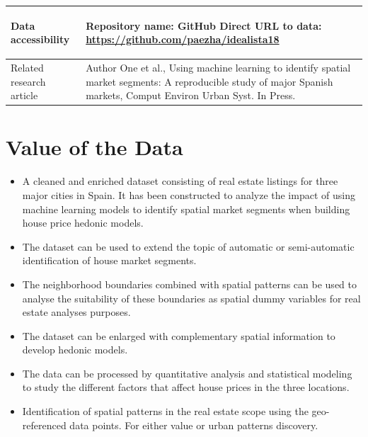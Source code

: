\documentclass[times,final]{elsarticle}
\begin{document}
{\begin{longtable}{|p{33mm}|p{94mm}|}
%
%
\hline
\hypertarget{target1}
{Data accessibility}   & Repository name: GitHub\newline
                         Direct URL to data: \url{https://github.com/paezha/idealista18}\\
\hline
Related
research\newline
article                & Author One et al., Using machine learning to identify spatial market segments: A reproducible study of major Spanish markets, Comput Environ Urban Syst. In Press.\newline
\end{longtable}
}

\section*{Value of the Data}

\begin{itemize}
\itemsep=0pt
\parsep=0pt
  \item A cleaned and enriched dataset consisting of real estate listings for three major cities in Spain. It has been constructed to analyze the impact of using machine learning models to identify spatial market segments when building house price hedonic models.
  \item The dataset can be used to extend the topic of automatic or semi-automatic identification of house market segments.
    \item The neighborhood boundaries combined with spatial patterns can be used to analyse the suitability of these boundaries as spatial dummy variables for real estate analyses purposes.
  \item The dataset can be enlarged with complementary spatial information to develop hedonic models.
  \item The data can be processed by quantitative analysis and statistical modeling to study the different factors that affect house prices in the three locations.
  \item Identification of spatial patterns in the real estate scope using the geo-referenced data points. For either value or urban patterns discovery.
\end{itemize}
\end{document}
